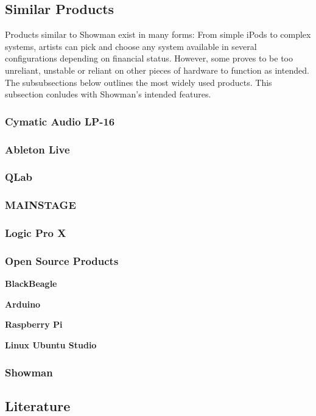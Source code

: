 \subsection{Similar Products}
Products similar to Showman exist in many forms: From simple iPods to complex systems, artists can pick and choose any system available in several configurations depending on financial status. However, some proves to be too unreliant, unstable or reliant on other pieces of hardware to function as intended. The subsubsections below outlines the most widely used products. This subsection conludes with Showman's intended features. \\

\subsubsection{Cymatic Audio LP-16}


\subsubsection{Ableton Live}


\subsubsection{QLab}


\subsubsection{MAINSTAGE}


\subsubsection{Logic Pro X}


\subsubsection{Open Source Products}


\textbf{BlackBeagle}


\textbf{Arduino}


\textbf{Raspberry Pi}


\textbf{Linux Ubuntu Studio}


\subsubsection{Showman}


\subsection{Literature}

